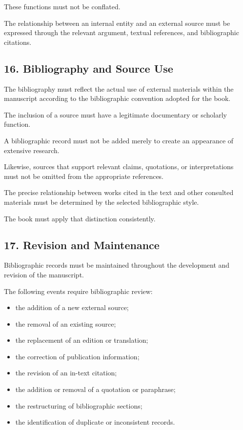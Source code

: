 These functions must
not be conflated.

The relationship between
an internal entity and
an external source
must be expressed
through the relevant
argument, textual
references, and
bibliographic citations.


\subsection*{16. Bibliography and Source Use}

The bibliography must
reflect the actual use
of external materials
within the manuscript
according to the
bibliographic convention
adopted for the book.

The inclusion of a
source must have
a legitimate documentary
or scholarly function.

A bibliographic record
must not be added
merely to create an
appearance of extensive
research.

Likewise, sources
that support relevant
claims, quotations,
or interpretations
must not be omitted
from the appropriate
references.

The precise relationship
between works cited
in the text and other
consulted materials
must be determined
by the selected
bibliographic style.

The book must apply
that distinction
consistently.


\subsection*{17. Revision and Maintenance}

Bibliographic records
must be maintained
throughout the development
and revision of the manuscript.

The following events
require bibliographic
review:

\begin{itemize}
    \item the addition
    of a new external source;
    \item the removal
    of an existing source;
    \item the replacement
    of an edition or
    translation;
    \item the correction
    of publication information;
    \item the revision
    of an in-text citation;
    \item the addition
    or removal of a
    quotation or paraphrase;
    \item the restructuring
    of bibliographic
    sections;
    \item the identification
    of duplicate or
    inconsistent records.
\end{itemize}

